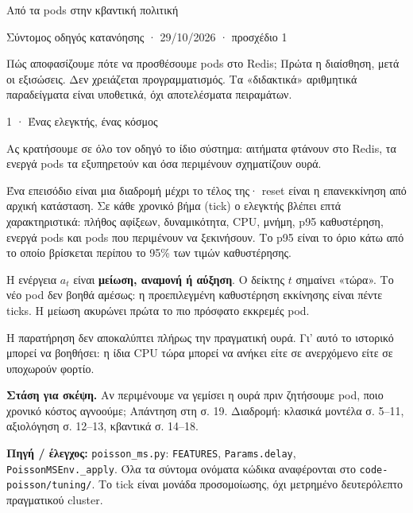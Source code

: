 \documentclass[11pt,a4paper]{article}
\newcommand{\think}[1]{\par\textbf{Στάση για σκέψη.} #1}
\newcommand{\src}[1]{\vfill{\footnotesize\color{ink}\textbf{Πηγή / έλεγχος:} #1\par}}
\newcommand{\code}[1]{{\footnotesize\nolinkurl{#1}}}
\begin{document}
{\sffamily\color{ink}\LARGE Από τα pods στην κβαντική πολιτική\par}
{\sffamily Σύντομος οδηγός κατανόησης · 29/10/2026 · προσχέδιο 1}\par
Πώς αποφασίζουμε πότε να προσθέσουμε pods στο Redis; Πρώτα η διαίσθηση, μετά οι εξισώσεις. Δεν χρειάζεται προγραμματισμός. Τα «διδακτικά» αριθμητικά παραδείγματα είναι υποθετικά, όχι αποτελέσματα πειραμάτων.

{\sffamily\color{ink}\Large 1 · Ένας ελεγκτής, ένας κόσμος\par}
Ας κρατήσουμε σε όλο τον οδηγό το ίδιο σύστημα: αιτήματα φτάνουν στο Redis, τα ενεργά pods τα εξυπηρετούν και όσα περιμένουν σχηματίζουν ουρά.

\begin{center}\end{center}

Ένα επεισόδιο είναι μια διαδρομή μέχρι το τέλος της· reset είναι η επανεκκίνηση από αρχική κατάσταση. Σε κάθε χρονικό βήμα (tick) ο ελεγκτής βλέπει επτά χαρακτηριστικά: πλήθος αφίξεων, δυναμικότητα, CPU, μνήμη, p95 καθυστέρηση, ενεργά pods και pods που περιμένουν να ξεκινήσουν. Το p95 είναι το όριο κάτω από το οποίο βρίσκεται περίπου το 95\% των τιμών καθυστέρησης.

Η ενέργεια $a_t$ είναι \textbf{μείωση, αναμονή ή αύξηση}. Ο δείκτης $t$ σημαίνει «τώρα». Το νέο pod δεν βοηθά αμέσως: η προεπιλεγμένη καθυστέρηση εκκίνησης είναι πέντε ticks. Η μείωση ακυρώνει πρώτα το πιο πρόσφατο εκκρεμές pod.

Η παρατήρηση δεν αποκαλύπτει πλήρως την πραγματική ουρά. Γι' αυτό το ιστορικό μπορεί να βοηθήσει: η ίδια CPU τώρα μπορεί να ανήκει είτε σε ανερχόμενο είτε σε υποχωρούν φορτίο.

\think{Αν περιμένουμε να γεμίσει η ουρά πριν ζητήσουμε pod, ποιο χρονικό κόστος αγνοούμε; Απάντηση στη σ. 19. Διαδρομή: κλασικά μοντέλα σ. 5–11, αξιολόγηση σ. 12–13, κβαντικά σ. 14–18.}
\src{\code{poisson_ms.py}: \code{FEATURES}, \code{Params.delay}, \code{PoissonMSEnv._apply}. Όλα τα σύντομα ονόματα κώδικα αναφέρονται στο \code{code-poisson/tuning/}. Το tick είναι μονάδα προσομοίωσης, όχι μετρημένο δευτερόλεπτο πραγματικού cluster.}
\end{document}
